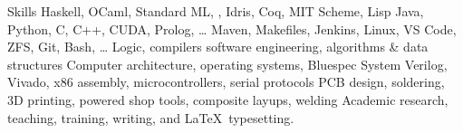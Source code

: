 
\begin{rubric}{Skills}
	Haskell, OCaml, Standard ML, \silver{}, Idris, Coq, MIT Scheme, Lisp
	Java, Python, C, C++, CUDA, Prolog, \ldots
\entry*[Tools]
	Maven, Makefiles, Jenkins, Linux, VS Code, ZFS, Git, Bash, \ldots
\entry*[CS Principles] Logic, compilers software engineering, algorithms \& data structures
	Computer architecture, operating systems, Bluespec System Verilog, Vivado, x86 assembly, microcontrollers, serial protocols
\entry*[Hardware]
	PCB design, soldering, 3D printing, powered shop tools, composite layups, welding
\entry*[Misc.]
	Academic research, teaching, training, writing, and \LaTeX\ typesetting.
\end{rubric}
